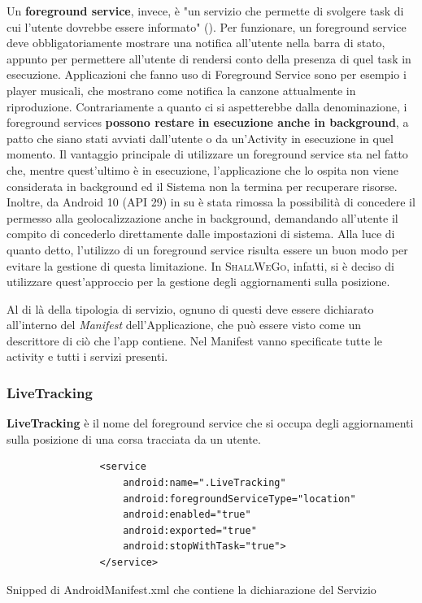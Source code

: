                 Un \textbf{foreground service}, invece, è "un servizio che permette di svolgere task di cui l'utente dovrebbe essere informato" (\cite{AndroidDocForeground}). Per funzionare, un foreground service deve obbligatoriamente mostrare una notifica all'utente nella barra di stato, appunto per permettere all'utente di rendersi conto della presenza di quel task in esecuzione. Applicazioni che fanno uso di Foreground Service sono per esempio i player musicali, che mostrano come notifica la canzone attualmente in riproduzione. Contrariamente a quanto ci si aspetterebbe dalla denominazione, i foreground services \textbf{possono restare in esecuzione anche in background}, a patto che siano stati avviati dall'utente o da un'Activity in esecuzione in quel momento. Il vantaggio principale di utilizzare un foreground service sta nel fatto che, mentre quest'ultimo è in esecuzione, l'applicazione che lo ospita non viene considerata in background ed il Sistema non la termina per recuperare risorse. Inoltre, da Android 10 (API 29) in su è stata rimossa la possibilità di concedere il permesso alla geolocalizzazione anche in background, demandando all'utente il compito di concederlo direttamente dalle impostazioni di sistema. Alla luce di quanto detto, l'utilizzo di un foreground service risulta essere un buon modo per evitare la gestione di questa limitazione. In \textsc{ShallWeGo}, infatti, si è deciso di utilizzare quest'approccio per la gestione degli aggiornamenti sulla posizione.

                Al di là della tipologia di servizio, ognuno di questi deve essere dichiarato all'interno del \textit{Manifest} dell'Applicazione, che può essere visto come un descrittore di ciò che l'app contiene. Nel Manifest vanno specificate tutte le activity e tutti i servizi presenti.
                \newpage
                \subsubsection{LiveTracking}
                    \textbf{LiveTracking} è il nome del foreground service che si occupa degli aggiornamenti sulla posizione di una corsa tracciata da un utente.

                    \begin{center}
                        \begin{code}
                            \begin{verbatim}
                <service
                    android:name=".LiveTracking"
                    android:foregroundServiceType="location"
                    android:enabled="true"
                    android:exported="true"
                    android:stopWithTask="true">
                </service>
                            \end{verbatim}
                            \caption{Snipped di AndroidManifest.xml che contiene la dichiarazione del Servizio}
                        \end{code}
                    \end{center}
    
